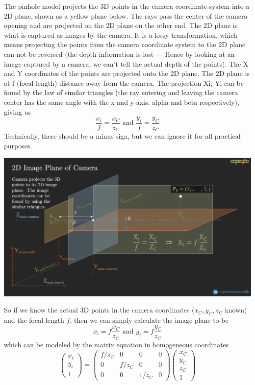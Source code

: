 \documentclass{article}
\theoremstyle{definition}
\theoremstyle{remark}
\theoremstyle{definition}
\begin{document}
The pinhole model projects the 3D points in the camera coordinate system into a 2D plane, shown as a yellow plane below. The rays pass the center of the camera opening and are projected on the 2D plane on the other end. The 2D plane is what is captured as images by the camera. It is a lossy transformation, which means projecting the points from the camera coordinate system to the 2D plane can not be reversed (the depth information is lost — Hence by looking at an image captured by a camera, we can’t tell the actual depth of the points). The X and Y coordinates of the points are projected onto the 2D plane. The 2D plane is at f (focal-length) distance away from the camera.  The projection Xi, Yi can be found by the law of similar triangles (the ray entering and leaving the camera center has the same angle with the x and y-axis, alpha and beta respectively), giving us 
\[\frac{x_i}{f} = \frac{x_C}{z_C} \text{ and } \frac{y_i}{f} = \frac{y_C}{z_C}\]
Technically, there should be a minus sign, but we can ignore it for all practical purposes. 
\begin{center}
    \includegraphics[scale=0.08]{img/X_triangle.png}
\end{center}
So if we know the actual 3D points in the camera coordinates ($x_C, y_C, z_C$ known) and the focal length $f$, then we can simply calculate the image plane to be 
\[x_i = f \frac{x_C}{z_C} \text{ and } y_i = f \frac{y_C}{z_C}\]
which can be modeled by the matrix equation in homogeneous coordinates
\[\begin{pmatrix} x_i \\ y_i \\ 1 \end{pmatrix} = \begin{pmatrix} f/z_C & 0 & 0 & 0 \\ 0 & f/z_C & 0 & 0 \\ 0 & 0 & 1/z_C & 0 \end{pmatrix} \begin{pmatrix} x_C \\ y_C \\ z_C \\ 1 \end{pmatrix} \]
\end{document}
